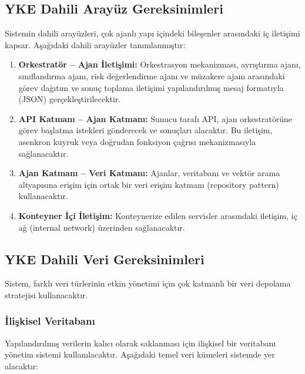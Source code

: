 \documentclass[12pt, a4paper]{article}
\begin{document}
\subsection{YKE Dahili Arayüz Gereksinimleri}

Sistemin dahili arayüzleri, çok ajanlı yapı içindeki bileşenler arasındaki iç iletişimi kapsar. Aşağıdaki dahili arayüzler tanımlanmıştır:

\begin{enumerate}[leftmargin=2cm]
    \item \textbf{Orkestratör -- Ajan İletişimi:} Orkestrasyon mekanizması, ayrıştırma ajanı, sınıflandırma ajanı, risk değerlendirme ajanı ve müzakere ajanı arasındaki görev dağıtım ve sonuç toplama iletişimi yapılandırılmış mesaj formatıyla (JSON) gerçekleştirilecektir.
    \item \textbf{API Katmanı -- Ajan Katmanı:} Sunucu tarafı API, ajan orkestratörüne görev başlatma istekleri gönderecek ve sonuçları alacaktır. Bu iletişim, asenkron kuyruk veya doğrudan fonksiyon çağrısı mekanizmasıyla sağlanacaktır.
    \item \textbf{Ajan Katmanı -- Veri Katmanı:} Ajanlar, veritabanı ve vektör arama altyapısına erişim için ortak bir veri erişim katmanı (repository pattern) kullanacaktır.
    \item \textbf{Konteyner İçi İletişim:} Konteynerize edilen servisler arasındaki iletişim, iç ağ (internal network) üzerinden sağlanacaktır.
\end{enumerate}

\subsection{YKE Dahili Veri Gereksinimleri}

Sistem, farklı veri türlerinin etkin yönetimi için çok katmanlı bir veri depolama stratejisi kullanacaktır.

\subsubsection{İlişkisel Veritabanı}
Yapılandırılmış verilerin kalıcı olarak saklanması için ilişkisel bir veritabanı yönetim sistemi kullanılacaktır. Aşağıdaki temel veri kümeleri sistemde yer alacaktır:
\end{document}
